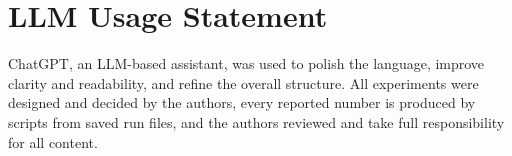 \documentclass[10pt,twocolumn,letterpaper]{article}
\newif\ifwithappendix \withappendixtrue
\begin{document}
\section*{LLM Usage Statement}
ChatGPT, an LLM-based assistant, was used to polish the language, improve clarity and readability, and refine the overall structure. All experiments were designed and decided by the authors, every reported number is produced by scripts from saved run files, and the authors reviewed and take full responsibility for all content.
{
    \small
      {}
}

\ifwithappendix\clearpage{}\appendix\fi
\end{document}
